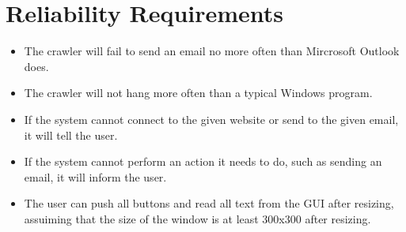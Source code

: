 \section{Reliability Requirements}
\begin{itemize}
\item The crawler will fail to send an email no more often than Mircrosoft Outlook does.
\item The crawler will not hang more often than a typical Windows program.
\item If the system cannot connect to the given website or send to the given email, it will tell the user.
\item If the system cannot perform an action it needs to do, such as sending an email, it will inform the user.
\item The user can push all buttons and read all text from the GUI after resizing, assuiming that the size of the window is at least 300x300 after resizing.
\end{itemize}
